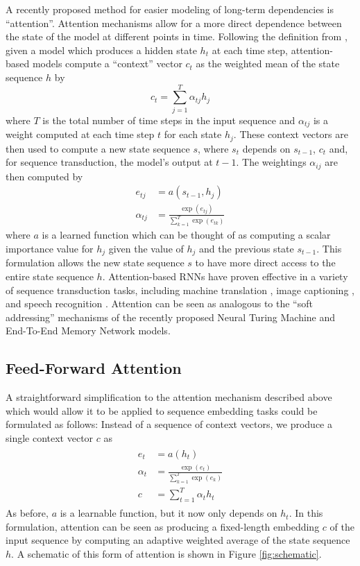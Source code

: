 \documentclass{article} %
\begin{document}
A recently proposed method for easier modeling of long-term dependencies is ``attention''.
Attention mechanisms allow for a more direct dependence between the state of the model at different points in time.
Following the definition from \cite{bahdanau2014neural}, given a model which produces a hidden state $h_t$ at each time step, attention-based models compute a ``context'' vector $c_t$ as the weighted mean of the state sequence $h$ by
$$
c_t = \sum_{j = 1}^T \alpha_{tj} h_j
$$
where $T$ is the total number of time steps in the input sequence and $\alpha_{tj}$ is a weight computed at each time step $t$ for each state $h_j$.
These context vectors are then used to compute a new state sequence $s$, where $s_t$ depends on $s_{t - 1}$, $c_t$ and, for sequence transduction, the model's output at $t - 1$.
The weightings $\alpha_{ij}$ are then computed by
\begin{align*}
e_{tj} &= a(s_{t - 1}, h_j)\\
\alpha_{tj} &= \frac{\exp(e_{tj})}{\sum_{k = 1}^T \exp(e_{tk})}
\end{align*}
where $a$ is a learned function which can be thought of as computing a scalar importance value for $h_j$ given the value of $h_j$ and the previous state $s_{t - 1}$.
This formulation allows the new state sequence $s$ to have more direct access to the entire state sequence $h$.
Attention-based RNNs have proven effective in a variety of sequence transduction tasks, including machine translation \cite{bahdanau2014neural}, image captioning \cite{xu2015show}, and speech recognition \cite{chan2015listen,bahdanau2015end}.
Attention can be seen as analogous to the ``soft addressing'' mechanisms of the recently proposed Neural Turing Machine \cite{graves2014neural} and End-To-End Memory Network \cite{sukhbaatar2015end} models.

\subsection{Feed-Forward Attention}

A straightforward simplification to the attention mechanism described above which would allow it to be applied to sequence embedding tasks could be formulated as follows:
Instead of a sequence of context vectors, we produce a single context vector $c$ as
\begin{align}
\begin{split}
\label{eq:ffattention}
e_t &= a(h_t)\\
\alpha_t &= \frac{\exp(e_t)}{\sum_{k = 1}^T \exp(e_k)}\\
c &= \sum_{t = 1}^T \alpha_t h_t
\end{split}
\end{align}
As before, $a$ is a learnable function, but it now only depends on $h_t$.
In this formulation, attention can be seen as producing a fixed-length embedding $c$ of the input sequence by computing an adaptive weighted average of the state sequence $h$.  A schematic of this form of attention is shown in Figure \ref{fig:schematic}.
\end{document}

